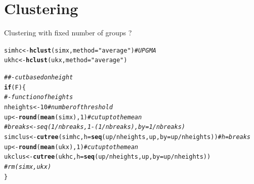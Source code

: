 \documentclass[]{revtex4}\usepackage[]{graphicx}\usepackage[]{color}
\makeatletter
\newcommand{\hlnum}[1]{\textcolor[rgb]{0.686,0.059,0.569}{#1}}%
\newcommand{\hlstr}[1]{\textcolor[rgb]{0.192,0.494,0.8}{#1}}%
\newcommand{\hlcom}[1]{\textcolor[rgb]{0.678,0.584,0.686}{\textit{#1}}}%
\newcommand{\hlopt}[1]{\textcolor[rgb]{0,0,0}{#1}}%
\newcommand{\hlstd}[1]{\textcolor[rgb]{0.345,0.345,0.345}{#1}}%
\newcommand{\hlkwa}[1]{\textcolor[rgb]{0.161,0.373,0.58}{\textbf{#1}}}%
\newcommand{\hlkwb}[1]{\textcolor[rgb]{0.69,0.353,0.396}{#1}}%
\newcommand{\hlkwc}[1]{\textcolor[rgb]{0.333,0.667,0.333}{#1}}%
\newcommand{\hlkwd}[1]{\textcolor[rgb]{0.737,0.353,0.396}{\textbf{#1}}}%
\newenvironment{kframe}{%
 \def\at@end@of@kframe{}%
 \ifinner\ifhmode%
  \def\at@end@of@kframe{\end{minipage}}%
  \begin{minipage}{\columnwidth}%
 \fi\fi%
 \def\FrameCommand##1{\hskip\@totalleftmargin \hskip-\fboxsep
 \colorbox{shadecolor}{##1}\hskip-\fboxsep
     \hskip-\linewidth \hskip-\@totalleftmargin \hskip\columnwidth}%
 \MakeFramed {\advance\hsize-\width
   \@totalleftmargin\z@ \linewidth\hsize
   \@setminipage}}%
 {\par\unskip\endMakeFramed%
 \at@end@of@kframe}
\newenvironment{knitrout}{}{} %
\makeatother
\begin{document}
\section{Clustering}
Clustering with fixed number of groups ?
\begin{knitrout}
\color{fgcolor}\begin{kframe}
\begin{alltt}
\hlstd{simhc} \hlkwb{<-} \hlkwd{hclust}\hlstd{(simx,} \hlkwc{method} \hlstd{=} \hlstr{"average"}\hlstd{)} \hlcom{# UPGMA}
\hlstd{ukhc} \hlkwb{<-} \hlkwd{hclust}\hlstd{(ukx,} \hlkwc{method} \hlstd{=} \hlstr{"average"}\hlstd{)}

\hlcom{##- cut based on height}
\hlkwa{if} \hlstd{(F)\{}
\hlcom{#- function of heights}
\hlstd{nheights} \hlkwb{<-} \hlnum{10} \hlcom{# number of threshold}
\hlstd{up} \hlkwb{<-} \hlkwd{round}\hlstd{(}\hlkwd{mean}\hlstd{(simx),} \hlnum{1}\hlstd{)} \hlcom{# cut up to the mean}
\hlcom{# breaks <-  seq(1/nbreaks, 1-(1/nbreaks), by = 1/nbreaks)}
\hlstd{simclus} \hlkwb{<-} \hlkwd{cutree}\hlstd{(simhc,} \hlkwc{h} \hlstd{=} \hlkwd{seq}\hlstd{(up} \hlopt{/} \hlstd{nheights, up,} \hlkwc{by} \hlstd{= up} \hlopt{/} \hlstd{nheights) )} \hlcom{# h = breaks}
\hlstd{up} \hlkwb{<-} \hlkwd{round}\hlstd{(}\hlkwd{mean}\hlstd{(ukx),}\hlnum{1}\hlstd{)} \hlcom{# cut up to the mean}
\hlstd{ukclus} \hlkwb{<-} \hlkwd{cutree}\hlstd{(ukhc,}  \hlkwc{h} \hlstd{=} \hlkwd{seq}\hlstd{(up} \hlopt{/} \hlstd{nheights, up,} \hlkwc{by} \hlstd{= up} \hlopt{/}\hlstd{nheights) )}
\hlcom{# rm(simx, ukx)}
\hlstd{\}}


\end{alltt}
\end{kframe}
\end{knitrout}
\end{document}
